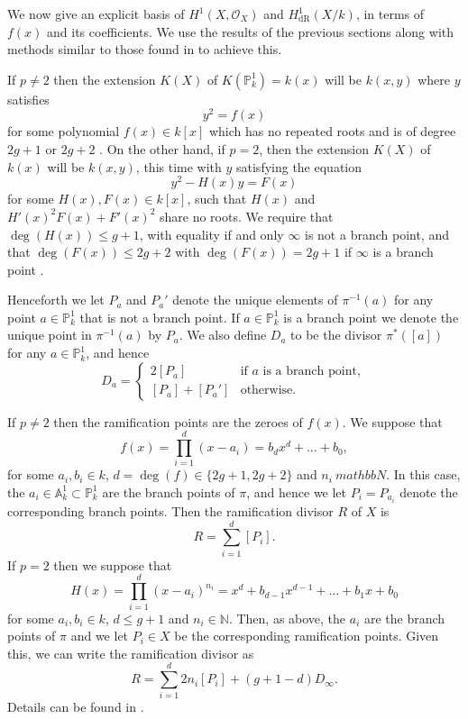 \documentclass[draft, 11pt]{article} %
\theoremstyle{plain}
\theoremstyle{remark}
\newcommand{\hone}{H^1(X,\mathcal{O}_X)}
\newcommand{\derhamhone}{H_{\text {dR}}^1(X/k)}
\begin{document}
We now give an explicit basis of $\hone$ and $\derhamhone$, in terms of $f(x)$ and its coefficients.
We use the results of the previous sections along with methods similar to those found in \cite{canonicalrepresentation} to achieve this.

If $p \neq 2$ then the extension $K(X)$ of $K(\mathbb P_k^1) = k(x)$ will be $k(x,y)$ where $y$ satisfies
\begin{equation}\label{definingequationpnot2}
y^2 = f(x)
\end{equation}
for some polynomial $f(x) \in k[x]$ which has no repeated roots and is of degree $2g+1$ or $2g+2$ \cite[Prop 7.4.24]{liu}.
On the other hand, if $p=2$, then the extension $K(X)$ of $k(x)$ will be $k(x,y)$, this time with $y$ satisfying the equation
\begin{equation}\label{definep=2}
y^2 - H(x)y = F(x)
\end{equation}
for some $H(x),F(x) \in k[x]$, such that $H(x)$ and $H'(x)^2F(x) + F'(x)^2$ share no roots.
We require that $\deg(H(x)) \leq g+1$, with equality if and only $\infty$ is not a branch point, and that $\deg(F(x)) \leq 2g+2$ with $\deg(F(x)) = 2g+1$ if $\infty$ is a branch point  \cite[Prop 7.4.24]{liu}.

Henceforth we let $P_a$ and $P_a'$ denote the unique elements of $\pi^{-1}(a)$ for any point $a \in \mathbb P_k^1$ that is not a branch point.
If $a \in \mathbb P_k^1$ is a branch point we denote the unique point in $\pi^{-1}(a)$ by $P_a$.
We also define $D_a$ to be the divisor $\pi^*\left([a]\right)$ for any $a \in \mathbb P_k^1$, and hence
\begin{equation*}
D_a= 
\begin{cases}
 2[P_a] & \text{if $a$ is a branch point}, \\
 [P_a] + [P_a'] & \text{otherwise.}
\end{cases}
\end{equation*}

If $p \neq 2$ then the ramification points are the zeroes of $f(x)$.
We suppose that 
\[
f(x) = \prod_{i=1}^d (x-a_i) = b_dx^d + \ldots + b_0,
\]
for some $a_i, b_i \in k$, $d = \deg(f) \in \{2g+1, 2g+2\}$ and $n_i \ mathbb N$.
In this case, the $a_i \in \mathbb A_k^1 \subset \mathbb P_k^1$ are the branch points of $\pi$, and hence we let $P_i = P_{a_i}$ denote the corresponding branch points.
Then the ramification divisor $R$ of $X$ is
\[
R = \sum_{i=1}^d [P_i].
\]
If $p=2$ then we suppose that
\begin{equation*}
H(x) = \prod_{i=1}^d (x-a_i)^{n_i} = x^d + b_{d-1}x^{d-1} + \ldots + b_1x + b_0
\end{equation*}
for some $a_i, b_i \in  k$, $d \leq g+1$ and $n_i \in \mathbb N$.
Then, as above, the $a_i$ are the branch points of $\pi$ and we let $P_i \in X$ be the corresponding ramification points.
Given this, we can write the ramification divisor as
\[
R = \sum_{i=1}^d 2n_i[P_i] + (g+1-d)D_\infty.
\]
Details can be found in \cite[\S 6]{faithfulaction}.
\end{document}
